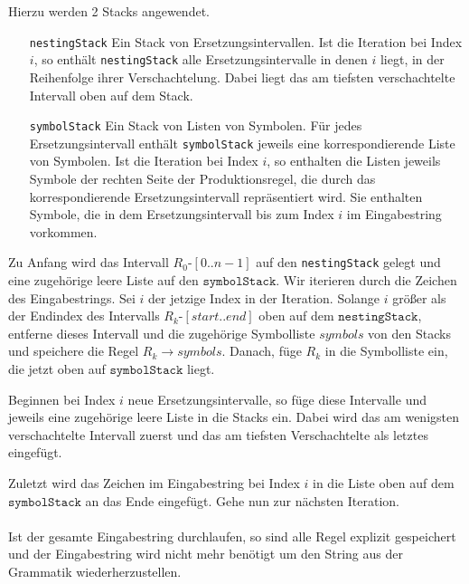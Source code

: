 
Hierzu werden 2 Stacks angewendet.
\begin{itemize}[leftmargin=2.5cm]
    \item[\texttt{nestingStack}] Ein Stack von Ersetzungsintervallen. Ist die Iteration bei Index $i$, so enthält \texttt{nestingStack} alle Ersetzungsintervalle in denen $i$ liegt, in der Reihenfolge ihrer Verschachtelung. Dabei liegt das am tiefsten verschachtelte Intervall oben auf dem Stack.
    \item[\texttt{symbolStack}] Ein Stack von Listen von Symbolen. Für jedes Ersetzungsintervall enthält \texttt{symbolStack} jeweils eine korrespondierende Liste von Symbolen. 
    Ist die Iteration bei Index $i$, so enthalten die Listen jeweils Symbole der rechten Seite der Produktionsregel, die durch das korrespondierende Ersetzungsintervall repräsentiert wird. Sie enthalten Symbole, die in dem Ersetzungsintervall bis zum Index $i$ im Eingabestring vorkommen. 
\end{itemize} 

Zu Anfang wird das Intervall $R_0$-$[0..n-1]$ auf den \texttt{nestingStack} gelegt und eine zugehörige leere Liste auf den $\texttt{symbolStack}$. 
Wir iterieren durch die Zeichen des Eingabestrings. Sei $i$ der jetzige Index in der Iteration.
Solange $i$ größer als der Endindex des Intervalls $R_k$-$[start..end]$ oben auf dem $\texttt{nestingStack}$, entferne dieses Intervall und die zugehörige Symbolliste $symbols$ von den Stacks und speichere die Regel $R_k \rightarrow symbols$. Danach, füge $R_k$ in die Symbolliste ein, die jetzt oben auf $\texttt{symbolStack}$ liegt.

Beginnen bei Index $i$ neue Ersetzungsintervalle, so füge diese Intervalle und jeweils eine zugehörige leere Liste in die Stacks ein. Dabei wird das am wenigsten verschachtelte Intervall zuerst und das am tiefsten Verschachtelte als letztes eingefügt.

Zuletzt wird das Zeichen im Eingabestring bei Index $i$ in die Liste oben auf dem $\texttt{symbolStack}$ an das Ende eingefügt. Gehe nun zur nächsten Iteration.\\\\

Ist der gesamte Eingabestring durchlaufen, so sind alle Regel explizit gespeichert und der Eingabestring wird nicht mehr benötigt um den String aus der Grammatik wiederherzustellen.

